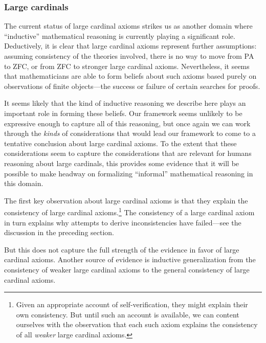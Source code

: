 \documentclass[12pt]{article}
\theoremstyle{definition}
\begin{document}
\subsubsection{Large cardinals}


The current status of large cardinal axioms strikes us as another
domain where ``inductive'' mathematical reasoning is currently playing
a significant role.
Deductively, it is clear that large cardinal axioms represent further assumptions:
assuming consistency of the theories involved, there is no way to
move from PA to ZFC, or from ZFC to stronger large cardinal axioms. %
Nevertheless, it seems that mathematicians are able to form beliefs about such axioms
based purely on observations of finite objects---the success or failure of certain searches for proofs.

It seems likely that the kind of inductive reasoning we describe here plays an important
role in forming these beliefs.
Our framework seems unlikely to be expressive enough to capture all of this reasoning,
but once again we can work through the \emph{kinds} of considerations
that would lead our framework to come to a tentative conclusion about large cardinal axioms.
To the extent that these considerations seem to capture the considerations
that are relevant for humans reasoning about large cardinals,
this provides some evidence that it will be possible to make headway
on formalizing ``informal'' mathematical reasoning in this domain.

The first key observation about large cardinal axioms is that they 
explain the consistency of large cardinal axioms.\footnote{Given
an appropriate account of self-verification, they might explain their
own consistency. But until such an account is available,
we can content ourselves with the observation that each such axiom
explains the consistency of all \emph{weaker} large cardinal axioms.}
The consistency of a large cardinal axiom in turn explains
why attempts to derive inconsistencies have failed---see the discussion
in the preceding section.


But this does not capture the full strength of the evidence in favor
of large cardinal axioms.
Another source of evidence is inductive generalization from the consistency
of weaker large cardinal axioms to the general consistency of large cardinal axioms.
\end{document}
